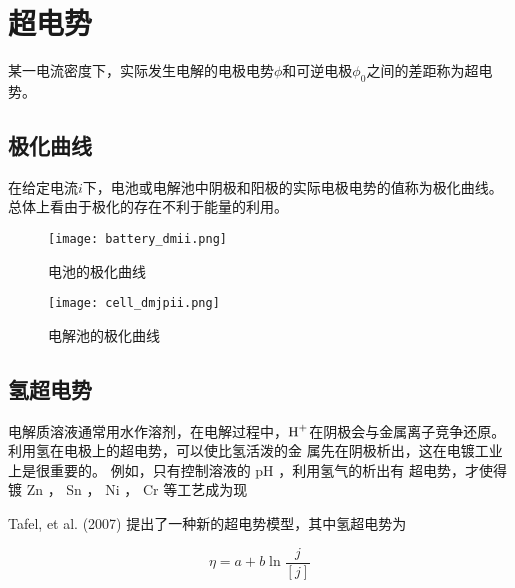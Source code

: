 

\section{超电势}


某一电流密度下，实际发生电解的电极电势$\phi$和可逆电极$\phi_0$之间的差距称为超电势。

\subsection{极化曲线}


在给定电流$i$下，电池或电解池中阴极和阳极的实际电极电势的值称为极化曲线。总体上看由于极化的存在不利于能量的利用。

\begin{figure}[h]
    \centering
    \texttt{[image: battery\_dmii.png]}
    \caption{电池的极化曲线}
    \label{fig:battery_dmii}
\end{figure}

\begin{figure}[h]
    \centering
    \texttt{[image: cell\_dmjpii.png]}
    \caption{电解池的极化曲线}
    \label{fig:cell_dmjpii}
\end{figure}




\subsection{氢超电势}

电解质溶液通常用水作溶剂，在电解过程中，$\ce{H+}$在阴极会与金属离子竞争还原。
利用氢在电极上的超电势，可以使比氢活泼的金
属先在阴极析出，这在电镀工业上是很重要的。
例如，只有控制溶液的 pH ，利用氢气的析出有
超电势，才使得镀 Zn ， Sn ， Ni ， Cr 等工艺成为现

Tafel, et al. (2007) 提出了一种新的超电势模型，其中氢超电势为

\begin{equation*}
    \eta = a + b \ln \frac{j}{[j]}
\end{equation*}


